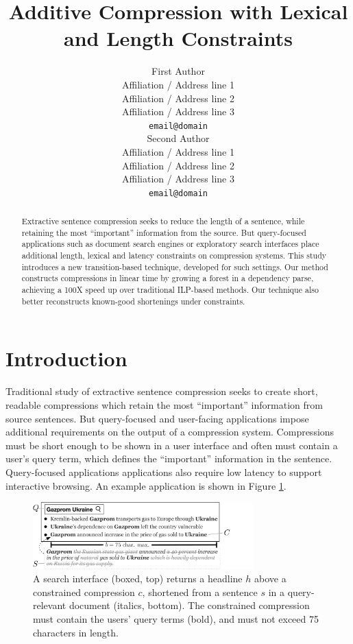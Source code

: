 \documentclass[11pt,a4paper]{article}
\title{Additive Compression with Lexical and Length Constraints}
\author{First Author \\
  Affiliation / Address line 1 \\
  Affiliation / Address line 2 \\
  Affiliation / Address line 3 \\
  {\tt email@domain} \\\And
  Second Author \\
  Affiliation / Address line 1 \\
  Affiliation / Address line 2 \\
  Affiliation / Address line 3 \\
  {\tt email@domain} \\}
\date{}
\begin{document}
\maketitle

\begin{abstract}
Extractive sentence compression seeks to reduce the length of a sentence, while retaining the most ``important'' information from the source. But query-focused applications such as document search engines or exploratory search interfaces place additional length, lexical and latency constraints on compression systems. This study introduces a new transition-based technique, developed for such settings. Our method constructs compressions in linear time by growing a forest in a dependency parse, achieving a 100X speed up over traditional ILP-based methods. Our technique also better reconstructs known-good shortenings under constraints.
\end{abstract}

\section{Introduction}\label{s:intro}

Traditional study of extractive sentence compression seeks to create short, readable compressions which retain the most ``important'' information from source sentences. But query-focused and user-facing applications impose additional requirements on the output of a compression system. Compressions must be short enough to be shown in a user interface and often must contain a user's query term, which defines the ``important'' information in the sentence. Query-focused applications applications also require low latency to support interactive browsing. An example application is shown in Figure \ref{f:qf}.

\begin{figure}[htb!]
\includegraphics[width=8.5cm]{qf.pdf}
\caption{A search interface (boxed, top) returns a headline $h$ above a constrained compression $c$, shortened from a sentence $s$ in a query-relevant document (italics, bottom). The constrained compression must contain the users' query terms (bold), and must not exceed 75 characters in length.}
\label{f:qf}
\end{figure}
\end{document}
